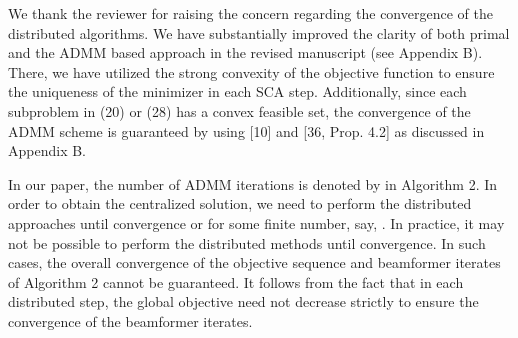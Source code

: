 \begin{enumerate}
\begin{comment}
	[R3] P. Jayasinghe, A. T\"{o}lli, J. Kaleva,  M. Latva-aho, "{Bi-directional Signaling for Dynamic TDD with Decentralized Beamforming}'', in \textit{Proceedings of IEEE ICC SmallNets Workshop}, London, UK, June, 2015		
	\vspace{1eM}
		
	\end{enumerate}
			
	\end{itemize}
			
\end{comment}			
				
\pagebreak
{} 

\resp We thank the reviewer for raising the concern regarding the convergence of the distributed algorithms. We have substantially improved the clarity of both primal and the \ac{ADMM} based approach in the revised manuscript (see Appendix B). There, we have utilized the strong convexity of the objective function to ensure the uniqueness of the minimizer in each \ac{SCA} step. Additionally, since each subproblem in (20) or (28) has a convex feasible set, the convergence of the \ac{ADMM} scheme is guaranteed by using [10] and [36, Prop. 4.2] as discussed in Appendix B. 

In our paper, the number of \ac{ADMM} iterations is denoted by  in Algorithm 2. In order to obtain the centralized solution, we need to perform the distributed approaches until convergence or for some finite number, say, . In practice, it may not be possible to perform the distributed methods until convergence. In such cases, the overall convergence of the objective sequence and beamformer iterates of Algorithm 2 cannot be guaranteed. It follows from the fact that in each distributed step, the global objective need not decrease strictly to ensure the convergence of the beamformer iterates.


\end{enumerate}
